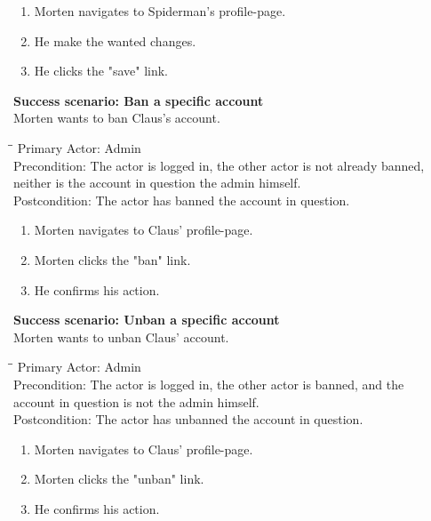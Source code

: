 \begin{enumerate} \setlength{\itemsep}{-1mm}
	\item Morten navigates to Spiderman's profile-page.
	\item He make the wanted changes.
	\item He clicks the "save" link.
\end{enumerate}
\vspace{3mm}
\textbf{Success scenario: Ban a specific account} \\
Morten wants to ban Claus's account.
\begin{tabbing}
\hspace{5mm}\=\hspace{26mm}\=\kill
\>Primary Actor:\> Admin\\
\>Precondition:\> The actor is logged in, the other actor is not already banned,\\ \hspace{85px} neither is the account in question the admin himself.\\
\>Postcondition:\> The actor has banned the account in question.
\end{tabbing}
\begin{enumerate} \setlength{\itemsep}{-1mm}
	\item Morten navigates to Claus' profile-page.
	\item Morten clicks the "ban" link.
	\item He confirms his action.
\end{enumerate}
\vspace{3mm}
\textbf{Success scenario: Unban a specific account} \\
Morten wants to unban Claus' account.
\begin{tabbing}
\hspace{5mm}\=\hspace{26mm}\=\kill
\>Primary Actor:\> Admin\\
\>Precondition:\> The actor is logged in, the other actor is banned, and the\\ \hspace{85px} account in question is not the admin himself.\\
\>Postcondition:\> The actor has unbanned the account in question.
\end{tabbing}
\begin{enumerate} \setlength{\itemsep}{-1mm}
	\item Morten navigates to Claus' profile-page.
	\item Morten clicks the "unban" link.
	\item He confirms his action.
\end{enumerate}
